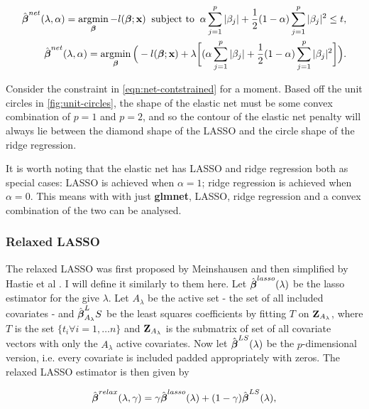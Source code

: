 \begin{align}
    \hat{\boldsymbol{\beta}}^{net}(\lambda,\alpha) = \operatorname*{argmin}_{\boldsymbol{\beta}} -l(\boldsymbol{\beta};\textbf{x})\;\;\textrm{subject to}\;\;\alpha\sum_{j=1}^p|\beta_j|+\frac{1}{2}(1-\alpha)\sum_{j=1}^p|\beta_j|^2\leq t,\label{eqn:net-contstrained}\\
    \hat{\boldsymbol{\beta}}^{net}(\lambda,\alpha)=\operatorname*{argmin}_{\boldsymbol{\beta}}\Big(-l(\boldsymbol{\beta};\textbf{x})+\lambda\bigg[(\alpha\sum_{j=1}^p|\beta_j|+\frac{1}{2}(1-\alpha)\sum_{j=1}^p|\beta_j|^2\bigg]\Big)\label{eqn:net-penalised}.
\end{align}

Consider the constraint in \cref{eqn:net-contstrained} for a moment. Based off the unit circles in \cref{fig:unit-circles}, the shape of the elastic net must be some convex combination of $p=1$ and $p=2$, and so the contour of the elastic net penalty will always lie between the diamond shape of the LASSO and the circle shape of the ridge regression.

It is worth noting that the elastic net has LASSO and ridge regression both as special cases: LASSO is achieved when $\alpha=1$; ridge regression is achieved when $\alpha=0$. This means with with just \textbf{glmnet}, LASSO, ridge regression and a convex combination of the two can be analysed.

\subsubsection{Relaxed LASSO}

The relaxed LASSO was first proposed by Meinshausen  and then simplified by Hastie et al . I will define it similarly to them here. Let $\hat{\boldsymbol{\beta}}^{lasso}(\lambda)$ be the lasso estimator for the give $\lambda$. Let $A_\lambda$ be the active set - the set of all included covariates - and $\hat{\boldsymbol{\beta}}_{A_\lambda}^LS$ be the least squares coefficients by fitting $T$ on $\textbf{Z}_{A_\lambda}$, where $T$ is the set $\{t_i\forall i=1,\ldots n\}$ and $\textbf{Z}_{A_\lambda}$ is the submatrix of set of all covariate vectors with only the $A_\lambda$ active covariates. Now let $\hat{\boldsymbol{\beta}}^{LS}(\lambda)$ be the $p$-dimensional version, i.e. every covariate is included padded appropriately with zeros. The relaxed LASSO estimator is then given by

\begin{equation}
    \hat{\boldsymbol{\beta}}^{relax}(\lambda,\gamma)=\gamma\hat{\boldsymbol{\beta}}^{lasso}(\lambda)+(1-\gamma)\hat{\boldsymbol{\beta}}^{LS}(\lambda),
\end{equation}

